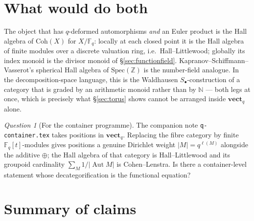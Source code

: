 \documentclass[11pt,a4paper]{article}
\theoremstyle{definition}
\theoremstyle{remark}
\newtheorem{question}[theorem]{Question}
\newcommand{\FF}{\mathbb{F}}
\newcommand{\NN}{\mathbb{N}}
\newcommand{\ZZ}{\mathbb{Z}}
\newcommand{\cat}[1]{\mathbf{#1}}
\newcommand{\vect}{\cat{vect}}
\DeclareMathOperator{\Aut}{Aut}
\newcommand{\norm}[1]{\lvert #1 \rvert}
\begin{document}
\section{What would do both}

The object that has $q$-deformed automorphisms \emph{and} an Euler product is the Hall
algebra of $\mathrm{Coh}(X)$ for $X/\FF_q$: locally at each closed point it is the Hall
algebra of finite modules over a discrete valuation ring, i.e.\ Hall--Littlewood; globally
its index monoid is the divisor monoid of \S\ref{sec:functionfield}. Kapranov--Schiffmann--
Vasserot's spherical Hall algebra of $\mathrm{Spec}(\ZZ)$ \cite{KSV} is the number-field
analogue. In the decomposition-space language, this is the Waldhausen
$S_\bullet$-construction of a category that is graded by an arithmetic monoid rather than
by $\NN$ --- both legs at once, which is precisely what \S\ref{sec:torus} shows cannot be
arranged inside $\vect_q$ alone.

\begin{question}[For the container programme]
The companion note \texttt{q-container.tex} takes positions in $\vect_q$. Replacing the
fibre category by finite $\FF_q[t]$-modules gives positions a genuine Dirichlet weight
$\norm{M} = q^{\ell(M)}$ alongside the additive $\oplus$; the Hall algebra of that
category is Hall--Littlewood and its groupoid cardinality $\sum_M 1/\norm{\Aut M}$ is
Cohen--Lenstra. Is there a container-level statement whose decategorification is the
functional equation?
\end{question}

\section{Summary of claims}
\end{document}
